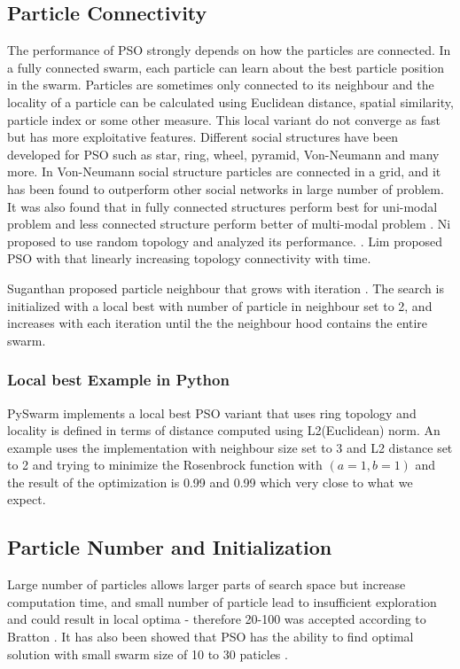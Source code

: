\documentclass{article}
\begin{document}
\subsection{Particle Connectivity}
The performance of PSO strongly depends on how the particles are connected. In a fully connected swarm, each particle can learn about the best particle position in the swarm. Particles are sometimes only connected to its neighbour and the locality of a particle can be calculated using Euclidean distance, spatial similarity, particle index or some other measure. This local variant do not converge as fast but has more exploitative features. Different social structures have been developed for PSO such as star, ring, wheel, pyramid, Von-Neumann and many more. In Von-Neumann social structure particles are connected in a grid, and it has been found to outperform other social networks in large number of problem. It was also found that in fully connected structures perform best for uni-modal problem and less connected structure perform better of multi-modal problem \cite{kennedy1999small}. Ni proposed to use random topology and analyzed its performance. \cite{ni2013new}. Lim proposed PSO with that linearly increasing topology connectivity with time.

Suganthan proposed particle neighbour that grows with iteration \cite{suganthan1999particle}. The search is initialized with a local best with number of particle in neighbour set to 2, and increases with each iteration until the the neighbour hood contains the entire swarm. 

\subsubsection{Local best Example in Python}
PySwarm implements a local best PSO variant that uses ring topology and locality is defined in terms of distance computed using L2(Euclidean) norm. An example uses the implementation with neighbour size set to 3 and L2 distance set to 2 and trying to minimize the Rosenbrock function with $(a = 1, b = 1)$ and the result of the optimization is 0.99 and 0.99 which very close to what we expect. \cite{irfan_2021P}




\subsection{Particle Number and Initialization}
Large number of particles allows larger parts of search space but increase computation time, and small number of particle lead to insufficient exploration and could result in local optima - therefore 20-100 was accepted according to Bratton \cite{bratton2007defining}. It has also been showed that PSO has the ability to find optimal solution with small swarm size of 10 to 30 paticles \cite{bergh2001effects}. 
\end{document}
